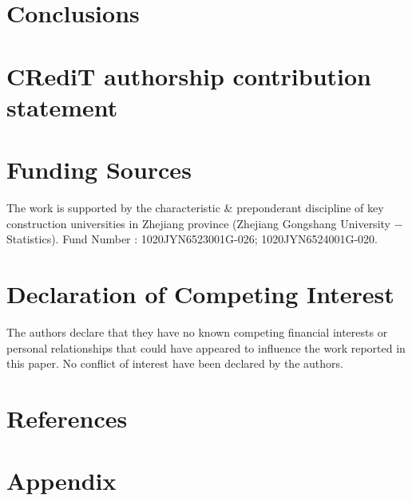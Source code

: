 \documentclass{elsarticle}
\begin{document}
\section{Conclusions}


\section*{CRediT authorship contribution statement}


\section*{Funding Sources}
The work is supported by the characteristic \& preponderant discipline of key construction universities in Zhejiang province (Zhejiang Gongshang University $-$ Statistics). Fund Number : 1020JYN6523001G-026; 1020JYN6524001G-020.

\section*{Declaration of Competing Interest}
The authors declare that they have no known competing financial interests or personal relationships that could have appeared to influence the work reported in this paper. No conflict of interest have been declared by the authors.

\section*{References}




\section*{Appendix}
\end{document}
